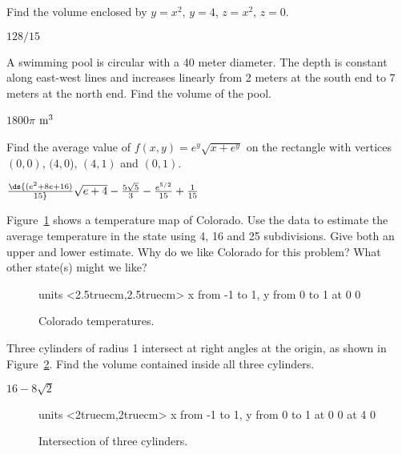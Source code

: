 \begin{enumialphparenastyle}
\begin{ex}
Find the volume enclosed by $y=x^2$, $y=4$, $z=x^2$, $z=0$.
\begin{sol}
$128/15$
\end{sol}
\end{ex}

\begin{ex}
A swimming pool is circular with a 40 meter diameter.  The
depth is constant along east-west lines and increases linearly from 2
meters at the south end to 7 meters at the north end.  Find the volume
of the pool.  
\begin{sol}
$1800\pi$ ${\rm m}^3$ 
\end{sol}
\end{ex}

\begin{ex}
Find the average value of $f(x,y)=e^y\sqrt{x+e^y}$ on the
    rectangle with vertices $(0,0)$, $(4,0$), $(4,1)$ and $(0,1)$.
\begin{sol}
$\ds{(e^2+8e+16)\over15}\sqrt{e+4}-{5\sqrt5\over3}-{e^{5/2}\over15}
+{1\over15}$
\end{sol}
\end{ex}

\begin{ex}
Figure~\ref{fig:colotemperatures} shows a temperature map
of Colorado.  Use the data to estimate the average temperature in the
state using 4, 16 and 25 subdivisions.  Give both an upper and lower
estimate.  Why do we like Colorado for this problem?  What other
state(s) might we like?

\begin{figure}[H]
\centerline{
\vbox{\beginpicture
\setcoordinatesystem units <2.5truecm,2.5truecm>
\setplotarea x from -1 to 1, y from 0 to 1
 at 0 0
\endpicture}}
\caption{Colorado temperatures.}
\label{fig:colotemperatures}
\end{figure}
\end{ex}

\begin{ex}
Three cylinders of radius 1 intersect at right angles at the
origin, as shown in Figure~\ref{fig:threecylinders}. Find the
volume contained inside all three cylinders.
\begin{sol}
$16-8\sqrt{2}$
\end{sol}

\begin{figure}[H]
\centerline{
\vbox{\beginpicture
\normalgraphs
\setcoordinatesystem units <2truecm,2truecm>
\setplotarea x from -1 to 1, y from 0 to 1
 at 0 0
 at 4 0
\endpicture}}
\caption{Intersection of three cylinders.}
\label{fig:threecylinders}
\end{figure}
\end{ex}


\end{enumialphparenastyle}
